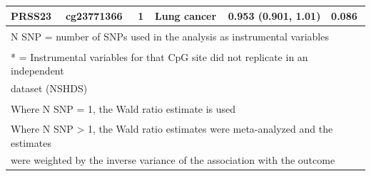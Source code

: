 \documentclass[11pt,oneside]{bristolthesis}
\begin{document}
\begin{table}[!h]
{\begin{tabular}[t]{llllll}
PRSS23 & cg23771366 & 1 & Lung cancer & 0.953 (0.901, 1.01) & 0.086\\
\bottomrule
\multicolumn{6}{l}{\textsuperscript{} N SNP = number of SNPs used in the analysis as instrumental variables}\\
\multicolumn{6}{l}{\textsuperscript{} * = Instrumental variables for that CpG site did not replicate in an independent}\\
\multicolumn{6}{l}{dataset (NSHDS)}\\
\multicolumn{6}{l}{\textsuperscript{} Where N SNP = 1, the Wald ratio estimate is used}\\
\multicolumn{6}{l}{\textsuperscript{} Where N SNP > 1, the Wald ratio estimates were meta-analyzed and the estimates}\\
\multicolumn{6}{l}{were weighted by the inverse variance of the association with the outcome}\\
\end{tabular}}
\end{table}
\pagebreak
\end{document}
